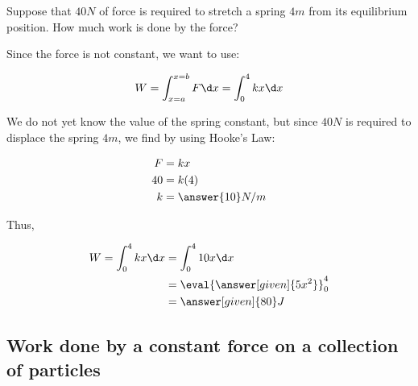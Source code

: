 \documentclass{ximera}
\begin{document}
\begin{example}
Suppose that $40N$ of force is required to stretch a spring $4m$ from its equilibrium position.  How much work is done by the force?

\begin{explanation}
Since the force is not constant, we want to use:

\[W=\int_{x=a}^{x=b} F \d x = \int_0^4 kx \d x\]

We do not yet know the value of the spring constant, but since $40 N$ is required to displace the spring $4m$, we find by using Hooke's Law:

\begin{align*}
F &= kx \\
40 &= k(4) \\
k &= \answer{10} N/m
\end{align*}

Thus, 

\begin{align*}
W= \int_0^4 kx \d x &= \int_0^4 10x \d x \\
&= \eval{\answer[given]{5x^2}}_0^4 \\
&= \answer[given]{80} J
\end{align*}


\end{explanation}

\end{example}




\subsection{Work done by a constant force on a collection of particles}

  
\end{document}

